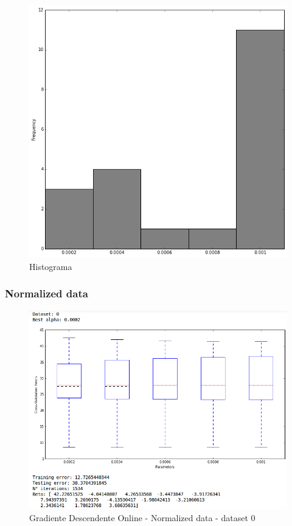 \documentclass[spanish, fleqn]{article}
\begin{document}
\begin{enumerate}
\begin{figure}[!htpb]
\centering
 \includegraphics[scale=0.4]{hist_gd_online_rescaled.png}
 \caption{Histograma}
\end{figure}

\subsubsection*{Normalized data}
\begin{figure}[!htpb]
\centering
 \includegraphics[scale=0.45]{gd_online_norm0.png}
 \caption{Gradiente Descendente Online - Normalized data - dataset 0}
\end{figure}


\end{enumerate}
\end{document}
